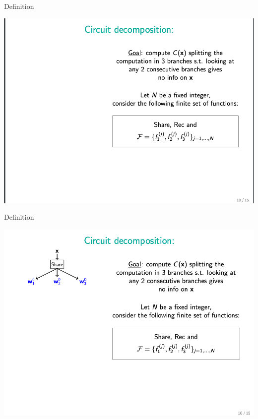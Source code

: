 \documentclass{beamer}
\begin{document}
\begin{frame}{Definition}
	\begin{minipage}{0.42\linewidth}
		\includegraphics[scale=0.4]{f12.png}
	\end{minipage}
\end{frame}


\begin{frame}{Definition}
	\begin{minipage}{0.42\linewidth}
		\includegraphics[scale=0.4]{f13.png}
	\end{minipage}
\end{frame}
\end{document}
